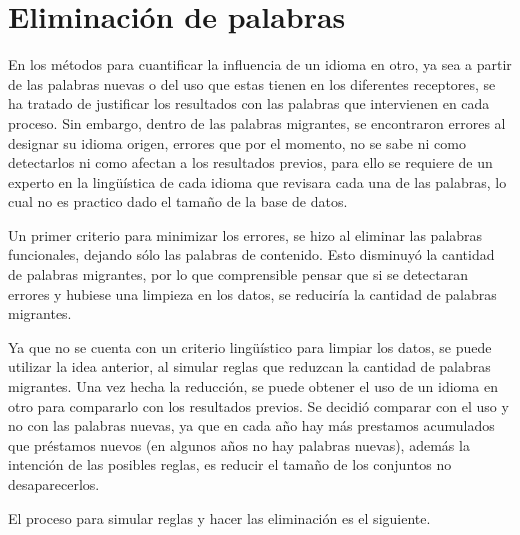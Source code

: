 \chapter{Eliminación de palabras}

En los métodos para cuantificar la influencia de un idioma en otro, ya sea a partir de las palabras nuevas o del uso que estas tienen en los diferentes receptores, se ha tratado de justificar los resultados con las palabras que intervienen en cada proceso. Sin embargo, dentro de las palabras migrantes, se encontraron errores al designar su idioma origen, errores que por el momento, no se sabe ni como detectarlos ni como afectan a los resultados previos,  para ello se requiere  de un experto en la lingüística de cada idioma que revisara cada una de las palabras, lo cual no es practico dado el tamaño de la base de datos.


Un primer criterio para minimizar los errores, se hizo al eliminar las palabras funcionales, dejando sólo las palabras de contenido. Esto disminuyó la cantidad de palabras migrantes, por lo que comprensible pensar que si se detectaran errores y hubiese una limpieza en los datos, se reduciría la cantidad de palabras migrantes. 

Ya que no se cuenta con un criterio lingüístico para limpiar los datos, se puede utilizar la idea anterior, al simular  reglas que reduzcan la cantidad de palabras migrantes. Una vez hecha la reducción, se puede obtener el uso de un idioma en otro para compararlo con los resultados previos. Se decidió comparar con el uso y no con las palabras nuevas, ya que en cada año hay más prestamos acumulados que préstamos nuevos (en algunos años no hay palabras nuevas), además la intención de las posibles reglas, es reducir el tamaño de los conjuntos no desaparecerlos.

El proceso para simular reglas y hacer las eliminación es el siguiente. 

